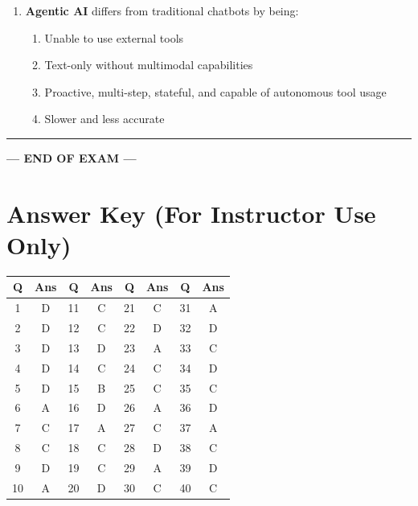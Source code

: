 \documentclass[11pt]{article}
\begin{document}
\begin{enumerate}
\item \textbf{Agentic AI} differs from traditional chatbots by being:
\begin{enumerate}[label=\Alph*)]
    \item Unable to use external tools
    \item Text-only without multimodal capabilities
    \item Proactive, multi-step, stateful, and capable of autonomous tool usage
    \item Slower and less accurate
\end{enumerate}

\end{enumerate}

\vspace{1cm}
\hrule
\vspace{0.5cm}

\begin{center}
\textbf{--- END OF EXAM ---}
\end{center}

\newpage
\section*{Answer Key (For Instructor Use Only)}

\begin{center}
\begin{tabular}{|c|c||c|c||c|c||c|c|}
\hline
\textbf{Q} & \textbf{Ans} & \textbf{Q} & \textbf{Ans} & \textbf{Q} & \textbf{Ans} & \textbf{Q} & \textbf{Ans} \\
\hline
1 & D & 11 & C & 21 & C & 31 & A \\
2 & D & 12 & C & 22 & D & 32 & D \\
3 & D & 13 & D & 23 & A & 33 & C \\
4 & D & 14 & C & 24 & C & 34 & D \\
5 & D & 15 & B & 25 & C & 35 & C \\
6 & A & 16 & D & 26 & A & 36 & D \\
7 & C & 17 & A & 27 & C & 37 & A \\
8 & C & 18 & C & 28 & D & 38 & C \\
9 & D & 19 & C & 29 & A & 39 & D \\
10 & A & 20 & D & 30 & C & 40 & C \\
\hline
\end{tabular}
\end{center}
\end{document}
